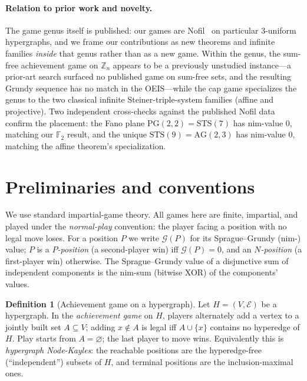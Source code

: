 \documentclass[11pt]{article}
\theoremstyle{plain}
\theoremstyle{definition}
\newtheorem{definition}{Definition}
\theoremstyle{remark}
\newcommand{\Zn}[1]{\mathbb{Z}_{#1}}
\newcommand{\AG}{\mathrm{AG}}
\newcommand{\PG}{\mathrm{PG}}
\newcommand{\STS}{\mathrm{STS}}
\newcommand{\Grundy}{\mathcal{G}}       %
\begin{document}
\paragraph{Relation to prior work and novelty.} The game genus itself is published: our games
are Nofil~\cite{huggan2022nofil} on particular $3$-uniform hypergraphs, and we frame our
contributions as new theorems and infinite families \emph{inside} that genus rather than as a new
game. Within the genus, the sum-free achievement game on $\Zn{n}$ appears to be a previously
unstudied instance---a prior-art search surfaced no published game on sum-free sets, and the
resulting Grundy sequence has no match in the OEIS---while the cap game specializes the genus to
the two classical infinite Steiner-triple-system families (affine and projective). Two independent
cross-checks against the published Nofil data confirm the placement: the Fano plane
$\PG(2,2)=\STS(7)$ has nim-value $0$, matching our $\mathbb{F}_2$ result, and the unique
$\STS(9)=\AG(2,3)$ has nim-value $0$, matching the affine theorem's specialization.

\section{Preliminaries and conventions}
\label{sec:prelim}

We use standard impartial-game theory. All games here are finite, impartial, and played under
the \emph{normal-play} convention: the player facing a position with no legal move loses. For a
position $P$ we write $\Grundy(P)$ for its Sprague--Grundy (nim-) value; $P$ is a \emph{$P$-position}
(a second-player win) iff $\Grundy(P)=0$, and an \emph{$N$-position} (a first-player win) otherwise.
The Sprague--Grundy value of a disjunctive sum of independent components is the nim-sum (bitwise
XOR) of the components' values.

\begin{definition}[Achievement game on a hypergraph]
Let $H=(V,\mathcal{E})$ be a hypergraph. In the \emph{achievement game} on $H$, players alternately
add a vertex to a jointly built set $A \subseteq V$; adding $x \notin A$ is legal iff $A \cup \{x\}$
contains no hyperedge of $H$. Play starts from $A=\varnothing$; the last player to move wins.
Equivalently this is \emph{hypergraph Node-Kayles}: the reachable positions are the hyperedge-free
(``independent'') subsets of $H$, and terminal positions are the inclusion-maximal ones.
\end{definition}
\end{document}
